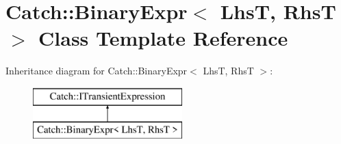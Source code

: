 \hypertarget{classCatch_1_1BinaryExpr}{}\section{Catch\+::Binary\+Expr$<$ LhsT, RhsT $>$ Class Template Reference}
\label{classCatch_1_1BinaryExpr}
Inheritance diagram for Catch\+::Binary\+Expr$<$ LhsT, RhsT $>$\+:\begin{figure}[H]
\begin{center}
\leavevmode
\includegraphics[height=2.000000cm]{classCatch_1_1BinaryExpr}
\end{center}
\end{figure}
